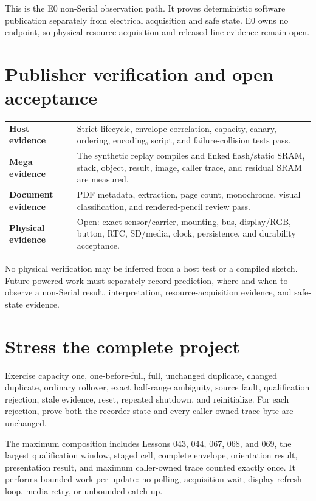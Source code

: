 \documentclass[10pt]{article}
\begin{document}
This is the E0 non-Serial observation path. It proves deterministic software
publication separately from electrical acquisition and safe state. E0 owns no
endpoint, so physical resource-acquisition and released-line evidence remain
open.

\section{Publisher verification and open acceptance}
\begin{tabularx}{\linewidth}{@{}>{\bfseries}l X@{}}
Host evidence & Strict lifecycle, envelope-correlation, capacity, canary,
ordering, encoding, script, and failure-collision tests pass.\\
Mega evidence & The synthetic replay compiles and linked flash/static SRAM,
stack, object, result, image, caller trace, and residual SRAM are measured.\\
Document evidence & PDF metadata, extraction, page count, monochrome, visual
classification, and rendered-pencil review pass.\\
Physical evidence & Open: exact sensor/carrier, mounting, bus, display/RGB,
button, RTC, SD/media, clock, persistence, and durability acceptance.\\
\end{tabularx}

No physical verification may be inferred from a host test or a compiled
sketch. Future powered work must separately record prediction, where and when
to observe a non-Serial result, interpretation, resource-acquisition evidence,
and safe-state evidence.

\newpage
\section{Stress the complete project}
Exercise capacity one, one-before-full, full, unchanged duplicate, changed
duplicate, ordinary rollover, exact half-range ambiguity, source fault,
qualification rejection, stale evidence, reset, repeated shutdown, and
reinitialize. For each rejection, prove both the recorder state and every
caller-owned trace byte are unchanged.

The maximum composition includes Lessons 043, 044, 067, 068, and 069,
the largest qualification window, staged cell, complete envelope, orientation
result, presentation result, and maximum caller-owned trace counted exactly
once. It performs bounded work per update: no polling, acquisition wait,
display refresh loop, media retry, or unbounded catch-up.
\end{document}
